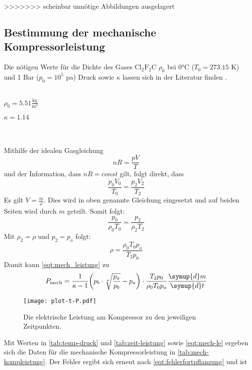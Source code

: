 >>>>>>> scheinbar unnötige Abbildungen ausgelagert
\subsection{Bestimmung der mechanische Kompressorleistung}

Die nötigen Werte für die Dichte des Gases $\text{Cl}_\text{2}\text{F}_\text{2}\text{C}$ $\rho_0$ bei 0°C ($T_0 = 273.15$ K) und 1 Bar ($p_0 = 10^5$ pa) Druck sowie $\kappa$ lassen sich in der Literatur finden \cite{206}.
\\ \\
\centerline{$\rho_0 = 5.51 \frac{\textrm{kg}}{\textrm{m}^3}$}
\centerline{$\kappa = 1.14$}
\\ \\
Mithilfe der idealen Gasgleichung
\begin{equation}
  nR = \frac{pV}{T}
\end{equation}
und der Information, dass $nR = const$ gilt, folgt direkt, dass
\begin{equation}
  \frac{p_0 V_0}{T_0} = \frac{p_2 V_2}{T_2}
\end{equation}
Es gilt $V = \frac{m}{\rho}$. Dies wird in oben genannte Gleichung eingesetzt und auf beiden Seiten wird durch $m$ geteilt. Somit folgt:
\begin{equation}
  \frac{p_0}{\rho_0 T_0} = \frac{p_2}{\rho_2 T_2}
\end{equation}
Mit $\rho_2 = \rho$ und $p_2 = p_a$ folgt:
\begin{equation}
  \rho = \frac{\rho_0 T_0 p_a}{T_2 p_0}
\end{equation}
Damit kann \eqref{eqt:mech_leistung} zu
\begin{equation}
\label{eqt:mech-le}
  P_\text{mech} = \frac{1}{\kappa - 1} \bigg(p_b \cdot \sqrt[\kappa]{\frac{p_a}{p_b}} - p_a\bigg) \cdot \frac{T_2 p_0}{\rho_0 T_0 p_a} \frac{\symup{d}m}{\symup{d}t}
\end{equation}


\begin{figure}
  \centering
  \texttt{[image: plot-t-P.pdf]}
  \caption{Die elektrische Leistung am Kompressor zu den jeweiligen Zeitpunkten.}
  \label{fig:plot_zeit-druck}
\end{figure}
Mit Werten in \autoref{tab:temp-druck} und \autoref{tab:zeit-leistung} sowie \eqref{eqt:mech-le} ergeben sich die Daten für die mechanische Kompressorleistung in \autoref{tab:mech-kompleistung}.
Der Fehler ergibt sich erneut nach \eqref{eqt:fehlerfortpflanzung} und ist

